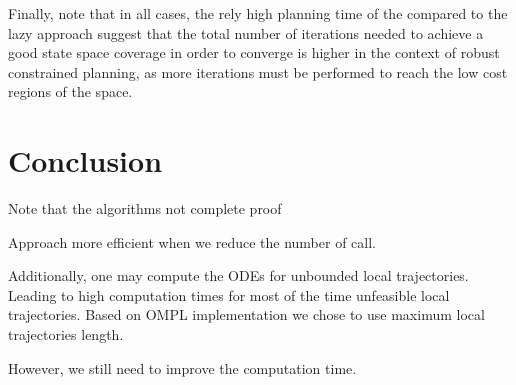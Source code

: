 Finally, note that in all cases, the rely high planning time of the  compared to the lazy approach suggest that the total number of iterations needed to achieve a good state space coverage in order to converge is higher in the context of robust constrained planning, as more iterations must be performed to reach the low cost regions of the space.
\section{Conclusion}\label{sec:concl}
Note that the algorithms not complete proof

Approach more efficient when we reduce the number of call. 

Additionally, one may compute the ODEs for unbounded local trajectories. 
Leading to high computation times for most of the time unfeasible local trajectories. 
Based on OMPL implementation we chose to use maximum local trajectories length.

However, we still need to improve the computation time.
